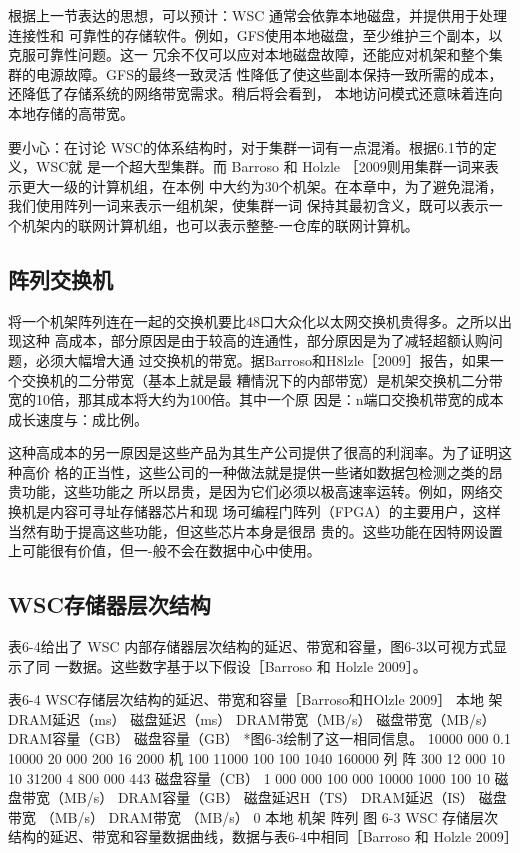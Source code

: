 根据上一节表达的思想，可以预计：WSC 通常会依靠本地磁盘，并提供用于处理连接性和
可靠性的存储软件。例如，GFS使用本地磁盘，至少维护三个副本，以克服可靠性问题。这一
冗余不仅可以应对本地磁盘故障，还能应对机架和整个集群的电源故障。GFS的最终一致灵活
性降低了使这些副本保持一致所需的成本，还降低了存储系统的网络带宽需求。稍后将会看到，
本地访问模式还意味着连向本地存储的高带宽。

要小心：在讨论 WSC的体系结构时，对于集群一词有一点混淆。根据6.1节的定义，WSC就
是一个超大型集群。而 Barroso 和 Holzle ［2009则用集群一词来表示更大一级的计算机组，在本例
中大约为30个机架。在本章中，为了避免混淆，我们使用阵列一词来表示一组机架，使集群一词
保持其最初含义，既可以表示一个机架内的联网计算机组，也可以表示整整-一仓库的联网计算机。

\subsection{阵列交换机}

将一个机架阵列连在一起的交换机要比48口大众化以太网交换机贵得多。之所以出现这种
高成本，部分原因是由于较高的连通性，部分原因是为了减轻超额认购问题，必须大幅增大通
过交换机的带宽。据Barroso和H8lzle［2009］报告，如果一个交换机的二分带宽（基本上就是最
糟情況下的内部带宽）是机架交换机二分带宽的10倍，那其成本将大约为100倍。其中一个原
因是：n端口交換机带宽的成本成长速度与：成比例。

这种高成本的另一原因是这些产品为其生产公司提供了很高的利润率。为了证明这种高价
格的正当性，这些公司的一种做法就是提供一些诸如数据包检测之类的昂贵功能，这些功能之
所以昂贵，是因为它们必须以极高速率运转。例如，网络交换机是内容可寻址存储器芯片和现
场可编程门阵列（FPGA）的主要用户，这样当然有助于提高这些功能，但这些芯片本身是很昂
贵的。这些功能在因特网设置上可能很有价值，但一-般不会在数据中心中使用。

\subsection{WSC存储器层次结构}
表6-4给出了 WSC 内部存储器层次结构的延迟、带宽和容量，图6-3以可视方式显示了同
一数据。这些数字基于以下假设［Barroso 和 Holzle 2009］。

表6-4 WSC存储层次结构的延迟、带宽和容量［Barroso和HOlzle 2009］
本地
架
DRAM延迟（ms）
磁盘延迟（ms）
DRAM带宽（MB/s）
磁盘带宽（MB/s）
DRAM容量（GB）
磁盘容量（GB）
*图6-3绘制了这一相同信息。
10000 000
0.1
10000
20 000
200
16
2000
机
100
11000
100
100
1040
160000
列
阵
300
12 000
10
10
31200
4 800 000
443
磁盘容量（CB）
1 000 000
100 000
10000
1000
100
10
磁盘带宽（MB/s）
DRAM容量（GB）
磁盘延迟H（TS）
DRAM延迟（IS）
磁盘带宽
（MB/s）
DRAM带宽 （MB/s）
0
本地
机架
阵列
图 6-3 WSC 存储层次结构的延迟、带宽和容量数据曲线，数据与表6-4中相同［Barroso 和 Holzle 2009］

